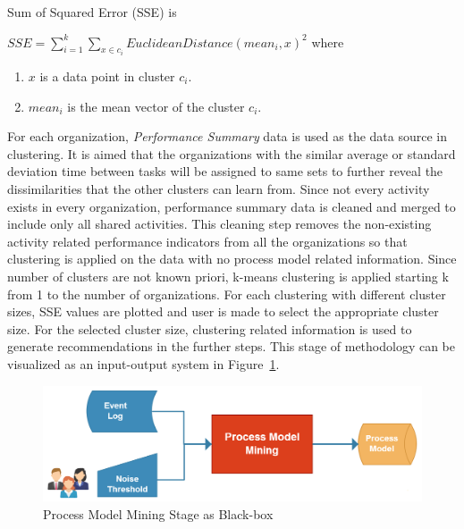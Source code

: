 \theoremstyle{definition}
\begin{definition}
Sum of Squared Error (SSE) is

$SSE = \sum_{i=1}^{k} \sum_{x \in c_{i}} EuclideanDistance(mean_{i}, x)^{2}$ where
\begin{enumerate}
  \item $x$ is a data point in cluster $c_{i}$.
  \item $mean_{i}$ is the mean vector of the cluster $c_{i}$.
\end{enumerate}
\end{definition}

For each organization, \textit{Performance Summary} data is used as the data source in clustering. It is aimed that the organizations with the similar average or standard deviation time between tasks will be assigned to same sets to further reveal the dissimilarities that the other clusters can learn from. Since not every activity exists in every organization, performance summary data is cleaned and merged to include only all shared activities. This cleaning step removes the non-existing activity related performance indicators from all the organizations so that clustering is applied on the data with no process model related information. Since number of clusters are not known priori, k-means clustering is applied starting k from 1 to the number of organizations. For each clustering with different cluster sizes, SSE values are plotted and user is made to select the appropriate cluster size. For the selected cluster size, clustering related information is used to generate recommendations in the further steps. This stage of methodology can be visualized as an input-output system in Figure~\ref{fig:process-model-mining-blackbox}.

\begin{figure}
  \centering
  \includegraphics[width=\textwidth]{4_methodology/process-model-mining-blackbox}
  \caption{Process Model Mining Stage as Black-box }
  \label{fig:process-model-mining-blackbox}
\end{figure}

